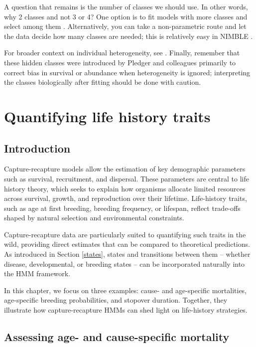\documentclass[
  12pt,
]{krantz}
\begin{document}
A question that remains is the number of classes we should use. In other words, why 2 classes and not 3 or 4? One option is to fit models with more classes and select among them \citep[e.g.,][]{cubaynes2012}. Alternatively, you can take a non-parametric route and let the data decide how many classes are needed; this is relatively easy in NIMBLE \citep[see][]{turek_bayesian_2021}.

For broader context on individual heterogeneity, see \citet{gimenez2018ih}. Finally, remember that these hidden classes were introduced by Pledger and colleagues primarily to correct bias in survival or abundance when heterogeneity is ignored; interpreting the classes biologically after fitting should be done with caution.

\chapter{Quantifying life history traits}\label{tradeoffs}

\section{Introduction}\label{introduction-10}

Capture-recapture models allow the estimation of key demographic parameters such as survival, recruitment, and dispersal. These parameters are central to life history theory, which seeks to explain how organisms allocate limited resources across survival, growth, and reproduction over their lifetime. Life-history traits, such as age at first breeding, breeding frequency, or lifespan, reflect trade-offs shaped by natural selection and environmental constraints.

Capture-recapture data are particularly suited to quantifying such traits in the wild, providing direct estimates that can be compared to theoretical predictions. As introduced in Section \ref{states}, states and transitions between them -- whether disease, developmental, or breeding states -- can be incorporated naturally into the HMM framework.

In this chapter, we focus on three examples: cause- and age-specific mortalities, age-specific breeding probabilities, and stopover duration. Together, they illustrate how capture-recapture HMMs can shed light on life-history strategies.

\section{Assessing age- and cause-specific mortality}\label{assessing-age--and-cause-specific-mortality}
\end{document}
